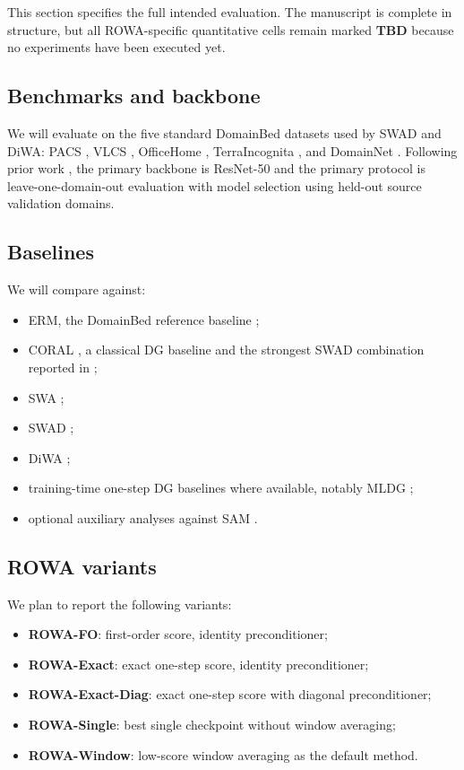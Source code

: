 \documentclass{article}
\newcommand{\TBD}{\textbf{TBD}}
\newcommand{\rowa}{\textup{\textsc{ROWA}}}
\newcommand{\swad}{\textup{\textsc{SWAD}}}
\begin{document}
This section specifies the full intended evaluation. The manuscript is complete in structure, but all \rowa{}-specific quantitative cells remain marked \TBD{} because no experiments have been executed yet.

\subsection{Benchmarks and backbone}

We will evaluate on the five standard DomainBed datasets used by \swad{} and DiWA: PACS \citep{li2017pacs}, VLCS \citep{fang2013vlcs}, OfficeHome \citep{venkateswara2017officehome}, TerraIncognita \citep{beery2018terraincognita}, and DomainNet \citep{peng2019domainnet}. Following prior work \citep{cha2021wad,rame2022diwa,gulrajani2021in}, the primary backbone is ResNet-50 and the primary protocol is leave-one-domain-out evaluation with model selection using held-out source validation domains.

\subsection{Baselines}

We will compare against:
\begin{itemize}[leftmargin=1.4em]
    \item ERM, the DomainBed reference baseline \citep{gulrajani2021in};
    \item CORAL \citep{sun2016coral}, a classical DG baseline and the strongest \swad{} combination reported in \citep{cha2021wad};
    \item SWA \citep{izmailov2018swa};
    \item \swad{} \citep{cha2021wad};
    \item DiWA \citep{rame2022diwa};
    \item training-time one-step DG baselines where available, notably MLDG \citep{li2018mldg};
    \item optional auxiliary analyses against SAM \citep{foret2021}.
\end{itemize}

\subsection{\rowa{} variants}

We plan to report the following variants:
\begin{itemize}[leftmargin=1.4em]
    \item \textbf{\rowa-FO}: first-order score, identity preconditioner;
    \item \textbf{\rowa-Exact}: exact one-step score, identity preconditioner;
    \item \textbf{\rowa-Exact-Diag}: exact one-step score with diagonal preconditioner;
    \item \textbf{\rowa-Single}: best single checkpoint without window averaging;
    \item \textbf{\rowa-Window}: low-score window averaging as the default method.
\end{itemize}
\end{document}
